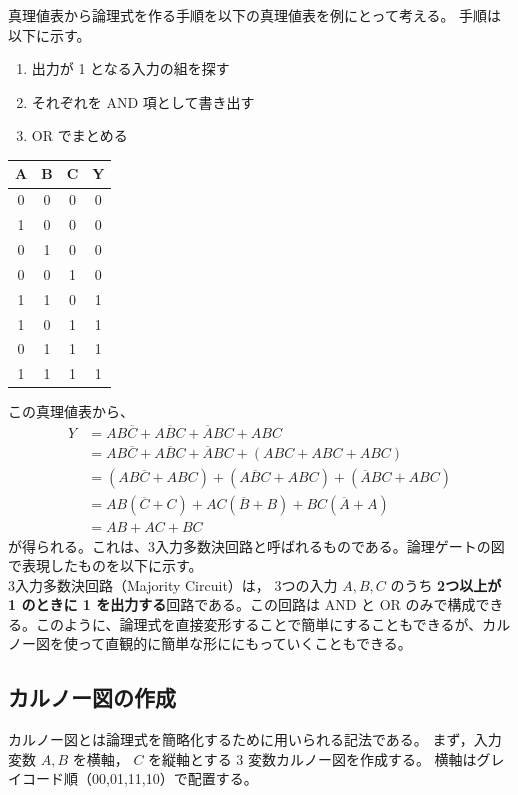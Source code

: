 真理値表から論理式を作る手順を以下の真理値表を例にとって考える。
手順は以下に示す。

\begin{enumerate}
  \item 出力が 1 となる入力の組を探す
  \item それぞれを AND 項として書き出す
  \item OR でまとめる
\end{enumerate}

\begin{center}
\begin{tabular}{ccc|c}
\toprule
A & B & C & Y \\
\midrule
0 & 0 & 0 & 0 \\
1 & 0 & 0 & 0 \\
0 & 1 & 0 & 0 \\
0 & 0 & 1 & 0 \\
1 & 1 & 0 & 1 \\
1 & 0 & 1 & 1 \\
0 & 1 & 1 & 1 \\
1 & 1 & 1 & 1 \\
\bottomrule
\end{tabular}
\end{center}

この真理値表から、
\[
\begin{aligned}
Y &= AB\overline{C} + A\overline{B}C + \overline{A}BC + ABC \\
  &= AB\overline{C} + A\overline{B}C + \overline{A}BC + (ABC + ABC + ABC) \\
  &= (AB\overline{C} + ABC) + (A\overline{B}C + ABC) + (\overline{A}BC + ABC) \\
  &= AB(\overline{C} + C) + AC(\overline{B} + B) + BC(\overline{A} + A) \\
  &= AB + AC + BC
\end{aligned}
\]
が得られる。これは、3入力多数決回路と呼ばれるものである。論理ゲートの図で表現したものを以下に示す。\\
3入力多数決回路（Majority Circuit）は，
3つの入力 $A,B,C$ のうち
\textbf{2つ以上が 1 のときに 1 を出力する}回路である。この回路は AND と OR のみで構成できる。このように、論理式を直接変形することで簡単にすることもできるが、カルノー図を使って直観的に簡単な形ににもっていくこともできる。

\subsection{カルノー図の作成}
カルノー図とは論理式を簡略化するために用いられる記法である。
まず，入力変数 $A,B$ を横軸，
$C$ を縦軸とする 3 変数カルノー図を作成する。
横軸はグレイコード順（00,01,11,10）で配置する。

